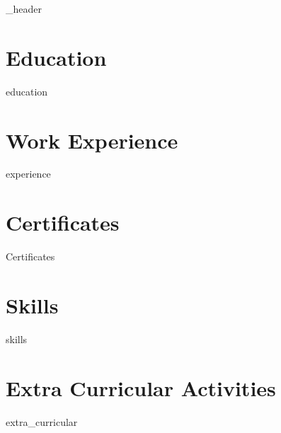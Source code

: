 \documentclass[letter,10pt]{article}
\author{Emir ORAL}
\begin{document}
{_header}
\vspace*{0 pt}

\section{Education}
{education}
\vspace*{1 pt}

\section{Work Experience}
{experience}
\vspace*{1 pt}

\section{Certificates}
{Certificates}
\vspace*{1 pt}

\section{Skills}
\vspace*{1 pt}
{skills}
\vspace*{4 pt}

\section{Extra Curricular Activities}
\vspace*{3pt}
{extra_curricular}
\vspace*{4 pt}
\end{document}

